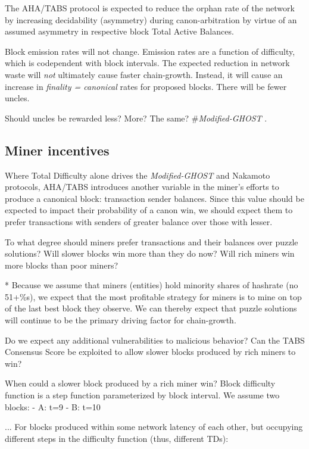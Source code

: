 \documentclass[11pt]{article}
\theoremstyle{plain}
\newcommand{\mghost}{\textit{Modified-GHOST }}
\begin{document}
{The AHA/TABS protocol is expected to reduce the orphan rate of the network by increasing decidability (asymmetry)
during canon-arbitration by virtue of an assumed asymmetry in respective block Total Active Balances.

Block emission rates will not change.
Emission rates are a function of difficulty, which is codependent with block intervals.
The expected reduction in network waste will \emph{not} ultimately cause faster chain-growth.
Instead, it will cause an increase in \emph{finality = canonical} rates for proposed blocks.
There will be fewer uncles.

Should uncles be rewarded less? More? The same? \#\mghost.

\subsection{\normalsize{Miner incentives}}

Where Total Difficulty alone drives the \mghost and Nakamoto protocols,
AHA/TABS introduces another variable in the miner's efforts to produce a canonical block: transaction sender balances.
Since this value should be expected to impact their probability of a canon win, we should expect them
to prefer transactions with senders of greater balance over those with lesser.

To what degree should miners prefer transactions and their balances over puzzle solutions?
Will slower blocks win more than they do now?
Will rich miners win more blocks than poor miners?

* Because we assume that miners (entities) hold minority shares of hashrate (no 51+\%s),
we expect that the most profitable strategy for miners is to mine on top of the last best
block they observe.
We can thereby expect that puzzle solutions will continue to be
the primary driving factor for chain-growth.

Do we expect any additional vulnerabilities to malicious behavior?
Can the TABS Consensus Score be exploited to allow slower blocks produced by rich miners to win?

When could a slower block produced by a rich miner win?
Block difficulty function is a step function parameterized by block interval.
We assume two blocks:
- A: t=9
- B: t=10

... For blocks produced within some network latency of each other, but occupying
different steps in the difficulty function (thus, different TDs):

}
\end{document}
